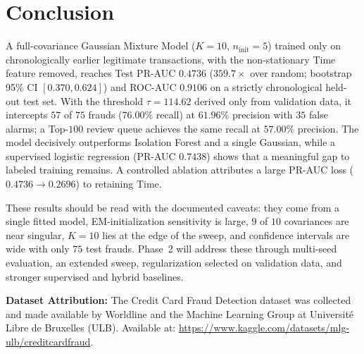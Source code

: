 \documentclass[11pt, a4paper]{article}
\begin{document}
\section{Conclusion}

A full-covariance Gaussian Mixture Model ($K=10$, $n_{\text{init}}=5$) trained only on chronologically earlier legitimate transactions, with the non-stationary $\text{Time}$ feature removed, reaches Test PR-AUC $0.4736$ ($359.7\times$ over random; bootstrap 95\% CI $[0.370, 0.624]$) and ROC-AUC $0.9106$ on a strictly chronological held-out test set. With the threshold $\tau = 114.62$ derived only from validation data, it intercepts $57$ of $75$ frauds ($76.00\%$ recall) at $61.96\%$ precision with $35$ false alarms; a Top-$100$ review queue achieves the same recall at $57.00\%$ precision. The model decisively outperforms Isolation Forest and a single Gaussian, while a supervised logistic regression (PR-AUC $0.7438$) shows that a meaningful gap to labeled training remains. A controlled ablation attributes a large PR-AUC loss ($0.4736 \to 0.2696$) to retaining $\text{Time}$.

These results should be read with the documented caveats: they come from a single fitted model, EM-initialization sensitivity is large, $9$ of $10$ covariances are near singular, $K=10$ lies at the edge of the sweep, and confidence intervals are wide with only $75$ test frauds. Phase~2 will address these through multi-seed evaluation, an extended sweep, regularization selected on validation data, and stronger supervised and hybrid baselines.

\vspace{0.5cm}
\noindent\textbf{Dataset Attribution:} The Credit Card Fraud Detection dataset was collected and made available by Worldline and the Machine Learning Group at Universit\'e Libre de Bruxelles (ULB). Available at: \url{https://www.kaggle.com/datasets/mlg-ulb/creditcardfraud}.
\end{document}
